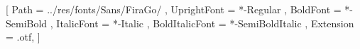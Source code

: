 \setsansfont{FiraGO}
[
	Path = ../res/fonts/Sans/FiraGo/ ,
	UprightFont = *-Regular ,
	BoldFont = *-SemiBold ,
	ItalicFont = *-Italic ,
	BoldItalicFont = *-SemiBoldItalic ,
	Extension = .otf,
]